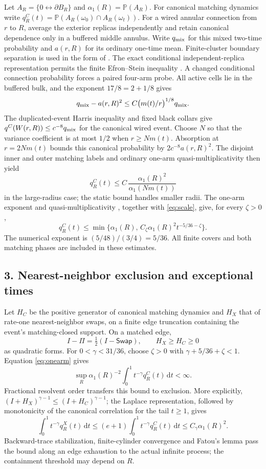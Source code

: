 \documentclass[11pt]{article}
\newcommand{\Pp}{\mathbb P}
\newcommand{\dd}{\,\mathrm d}
\begin{document}
Let $A_R=\{0\leftrightarrow\partial B_R\}$ and
$\alpha_1(R)=\Pp(A_R)$. For canonical matching dynamics write
$q_R^C(t)=\Pp(A_R(\omega_0)\cap A_R(\omega_t))$.
For a wired annular connection from $r$ to $R$, average the exterior
replicas independently and retain canonical dependence only in a
buffered middle annulus. Write $q_{\rm mix}$ for this mixed two-time
probability and $a(r,R)$ for its ordinary one-time mean. Finite-cluster
boundary separation is used in the form of \cite[Section 5.5]{Grimmett}.
The exact
conditional independent-replica representation permits the finite
Efron--Stein inequality \cite[Proposition 1]{BBLM}. A changed conditional connection
probability forces a paired four-arm probe. All active cells lie in the
buffered bulk, and the exponent $17/8=2+1/8$ gives
\[
 q_{\rm mix}-a(r,R)^2
       \leq C\bigl(m(t)/r\bigr)^{1/8}q_{\rm mix}.
\]
The duplicated-event Harris inequality and fixed black collars give
$q^C(W(r,R))\leq c^{-8}q_{\rm mix}$ for the canonical wired event.
Choose $N$ so that the variance coefficient is at most $1/2$ when
$r\geq Nm(t)$. Absorption at $r=2Nm(t)$ bounds this canonical
probability by $2c^{-8}a(r,R)^2$. The disjoint inner and outer matching
labels and ordinary one-arm quasi-multiplicativity then yield
\[
 q_R^C(t)\leq C\,
       \frac{\alpha_1(R)^2}{\alpha_1(Nm(t))}
\]
in the large-radius case; the static bound handles smaller radii.
The one-arm exponent and quasi-multiplicativity \cite{LSW,Nolin},
together with \eqref{eq:scale}, give, for every $\zeta>0$,
\begin{equation}\label{eq:onearm}
 q_R^C(t)\leq
 \min\bigl\{\alpha_1(R),\,
             C_\zeta\alpha_1(R)^2t^{-5/36-\zeta}\bigr\}.
\end{equation}
The numerical exponent is
$(5/48)/(3/4)=5/36$. All finite covers and both matching phases are
included in these estimates.

\subsection*{3. Nearest-neighbor exclusion and exceptional times}

Let $H_C$ be the positive generator of canonical matching dynamics
and $H_X$ that of rate-one nearest-neighbor swaps, on a finite edge
truncation containing the event's matching-closed support. On a matched edge,
\[
 I-\Pi=\tfrac12(I-\mathsf{Swap}),
 \qquad H_X\geq H_C\geq0
\]
as quadratic forms. For $0<\gamma<31/36$, choose $\zeta>0$ with
$\gamma+5/36+\zeta<1$. Equation \eqref{eq:onearm} gives
\[
 \sup_R\alpha_1(R)^{-2}
       \int_0^1t^{-\gamma}q_R^C(t)\dd t<\infty.
\]
Fractional resolvent order transfers this bound to exclusion. More
explicitly, $(I+H_X)^{\gamma-1}\leq(I+H_C)^{\gamma-1}$; the Laplace
representation, followed by monotonicity of the canonical correlation
for the tail $t\geq1$, gives
\begin{equation}\label{eq:energy}
 \int_0^1t^{-\gamma}q_R^X(t)\dd t
       \leq(e+1)\int_0^1t^{-\gamma}q_R^C(t)\dd t
       \leq C_\gamma\alpha_1(R)^2.
\end{equation}
Backward-trace stabilization, finite-cylinder convergence
and Fatou's lemma pass the bound along an edge exhaustion to the
actual infinite process; the containment threshold may depend on $R$.
\end{document}
